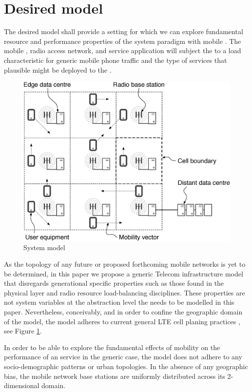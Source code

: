\section{Desired model}
\label{sec:desiard_model}

The desired model shall provide a setting for which we can explore fundamental resource and performance properties of the \xcloud{} system paradigm with mobile \ues{}. The mobile \ues{}, radio access network, and service application will subject the \dcs{} to a load characteristic for generic mobile phone traffic and the type of services that plausible might be deployed to the \xcloud{}.

\begin{figure}[tb]
	\centering
	\includegraphics[width=\linewidth]{fig_system_model.eps} 
	\caption{System model}
	\label{fig:system_model}
\end{figure}

As the topology of any future \xcloud{} or proposed forthcoming mobile networks is yet to be determined, in this paper we propose a generic Telecom infrastructure model that disregards generational specific properties such as those found in the physical layer and radio resource load-balancing disciplines. These properties are not system variables at the abstraction level the \xcloud{} needs to be modelled in this paper. Nevertheless, conceivably, and in order to confine the geographic domain of the model, the model adheres to current general LTE cell planing practices \cite{salo2010practical}, see Figure \ref{fig:system_model}.

In order to be able to explore the fundamental effects of mobility on the performance of an \xcloud{} service in the generic case, the model does not adhere to any socio-demographic patterns or urban topologies. In the absence of any geographic bias, the mobile network base stations are uniformly distributed across its 2-dimensional domain.

